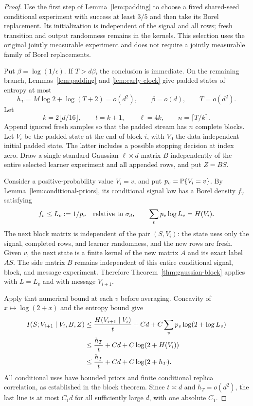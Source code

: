 \begin{proof}
Use the first step of Lemma~\ref{lem:padding} to choose a fixed shared-seed
conditional experiment with success at least $3/5$ and then take its Borel
replacement. Its initialization is independent of the signal and all rows;
fresh transition and output randomness remains in the kernels. This
selection uses the original jointly measurable experiment and does not
require a jointly measurable family of Borel replacements.

Put $\beta=\log(1/\epsilon)$. If $T>d\beta$, the conclusion is immediate.
On the remaining branch, Lemmas~\ref{lem:padding} and
\ref{lem:early-clock} give padded states of entropy at most
\begin{equation}\label{eq:gaussian-clock-width}
 h_T=M\log2+\log(T+2)=o(d^2),
 \qquad \beta=o(d),\qquad T=o(d^2).
\end{equation}
Let
\[
 k=2\lfloor d/16\rfloor,\qquad t=k+1,\qquad
 \ell=4k,\qquad n=\lceil T/k\rceil.
\]
Append ignored fresh samples so that the padded stream has $n$ complete
blocks. Let $V_i$ be the padded state at the end of block $i$, with $V_0$
the data-independent initial padded state. The latter includes a possible
stopping decision at index zero. Draw a single standard Gaussian
$\ell\times d$ matrix $B$ independently of the entire selected learner
experiment and all appended rows, and put $Z=BS$.

Consider a positive-probability value $V_i=v$, and put
$p_v=\mathbb P\{V_i=v\}$. By Lemma~\ref{lem:conditional-priors}, its conditional
signal law has a Borel density $f_v$ satisfying
\[
 f_v\le L_v:=1/p_v
 \quad\hbox{relative to }\sigma_d,\qquad
 \sum_v p_v\log L_v=H(V_i).
\]
The next block matrix is independent of the pair $(S,V_i)$: the state uses
only the signal, completed rows, and learner randomness, and the new rows
are fresh. Given $v$, the next state is a finite kernel of the new matrix
$A$ and its exact label $AS$. The side matrix $B$ remains independent of
this entire conditional signal, block, and message experiment. Therefore
Theorem~\ref{thm:gaussian-block} applies with $L=L_v$ and with message
$V_{i+1}$.

Apply that numerical bound at each $v$ before averaging. Concavity of
$x\mapsto\log(2+x)$ and the entropy bound give
\begin{align}
 I(S;V_{i+1}\mid V_i,B,Z)
 &\le \frac{H(V_{i+1}\mid V_i)}{t}
      +Cd+C\sum_vp_v\log(2+\log L_v) \notag\\
 &\le \frac{h_T}{t}+Cd+C\log(2+H(V_i)) \notag\\
 &\le \frac{h_T}{t}+Cd+C\log(2+h_T).
 \label{eq:gaussian-current-step}
\end{align}
All conditional uses have bounded priors and finite conditional replica
correlation, as established in the block theorem. Since $t\asymp d$ and
$h_T=o(d^2)$, the last line is at most $C_1d$ for all sufficiently large
$d$, with one absolute $C_1$.


\end{proof}
